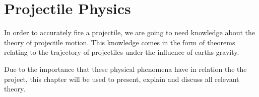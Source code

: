 \chapter{Projectile Physics}\label{ProjPhys}
In order to accurately fire a projectile, we are going to need knowledge about
the theory of projectile motion. This knowledge comes in the form of theorems
relating to the trajectory of projectiles under the influence of earths
gravity.


Due to the importance that these physical phenomena have in relation the the
project, this chapter will be used to present, explain and discuss all relevant
theory.





